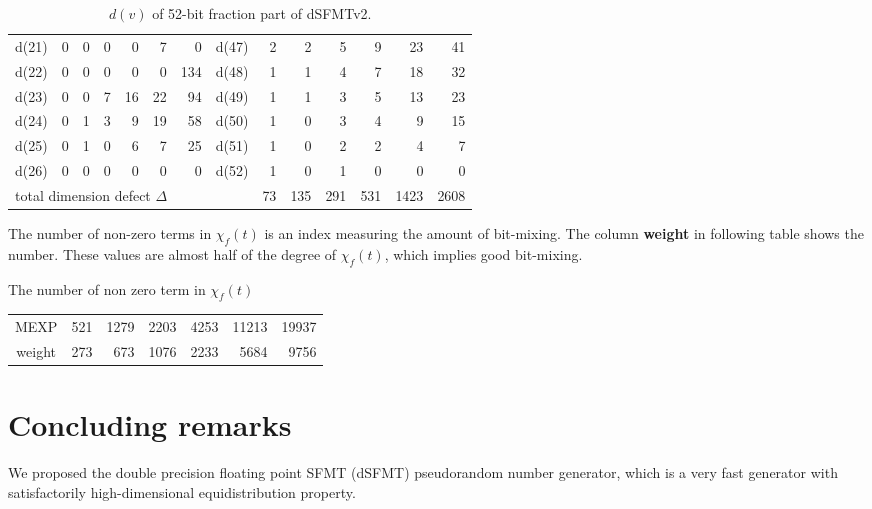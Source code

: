 \documentclass{svmult}
\begin{document}
\begin{table}
\begin{center}
\begin{tabular}{|r|rrrrrr||r|rrrrrr|}
      d(21) & 0 & 0 & 0 & 0 & 7 & 0 & d(47) & 2 & 2 & 5 & 9 & 23 & 41 \\
      d(22) & 0 & 0 & 0 & 0 & 0 & 134 & d(48) & 1 & 1 & 4 & 7 & 18 & 32 \\
      d(23) & 0 & 0 & 7 & 16 & 22 & 94 & d(49) & 1 & 1 & 3 & 5 & 13 & 23 \\
      d(24) & 0 & 1 & 3 & 9 & 19 & 58 & d(50) & 1 & 0 & 3 & 4 & 9 & 15 \\
      d(25) & 0 & 1 & 0 & 6 & 7 & 25 & d(51) & 1 & 0 & 2 & 2 & 4 & 7 \\
      d(26) & 0 & 0 & 0 & 0 & 0 & 0 & d(52) & 1 & 0 & 1 & 0 & 0 & 0 \\ \hline
      \multicolumn{8}{|l|}{total dimension defect $\Delta$} 
      & 73 & 135 & 291 & 531 & 1423 & 2608 \\ \hline
    \end{tabular}
  \end{center}
  \caption{$d(v)$ of 52-bit fraction part of dSFMTv2.}
  \label{tab:dd}
\end{table}

\begin{remark}
  The number of non-zero terms in $\chi_f(t)$ is an index measuring
  the amount of bit-mixing.  The column \textbf{weight} in
  following table shows the number. These values are almost
  half of the degree of $\chi_f(t)$, which implies good bit-mixing.
\end{remark}

\begin{center}
  The number of non zero term in $\chi_f(t)$
  \begin{tabular}{crrrrrr} \hline
    MEXP & 521 & 1279 & 2203 & 4253 & 11213 & 19937 \\
    weight & 273 & 673 & 1076 & 2233 & 5684 & 9756 \\ \hline
  \end{tabular}
\end{center}
\section{Concluding remarks}
We proposed the double precision floating point SFMT (dSFMT)
pseudorandom number generator, which is a very fast generator with
satisfactorily high-dimensional equidistribution property.
\end{document}
